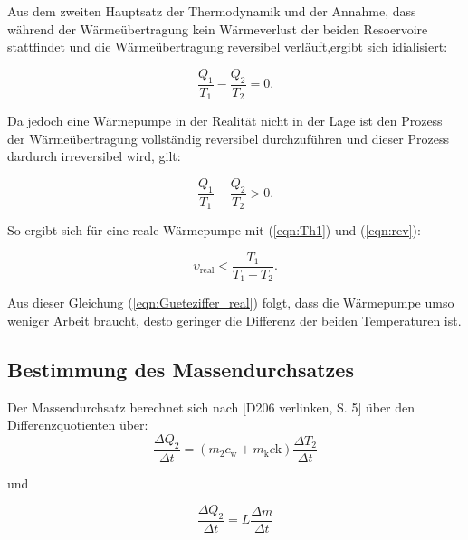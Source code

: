         Aus dem zweiten Hauptsatz der Thermodynamik und der Annahme, dass während der Wärmeübertragung kein Wärmeverlust der beiden Resoervoire stattfindet
         und die Wärmeübertragung reversibel verläuft,ergibt sich idialisiert:

        \begin{equation}
            \frac{Q_1}{T_1} - \frac{Q_2}{T_2} = 0.
            \label{eqn:irev}
        \end{equation}
        
        Da jedoch eine Wärmepumpe in der Realität nicht in der Lage ist den Prozess der Wärmeübertragung vollständig reversibel durchzuführen und dieser Prozess dardurch irreversibel wird, gilt:

        \begin{equation}
            \frac{Q_1}{T_1} - \frac{Q_2}{T_2} > 0.
            \label{eqn:rev}
        \end{equation}

        So ergibt sich für eine reale Wärmepumpe mit (\ref{eqn:Th1}) und (\ref{eqn:rev}):

        \begin{equation}
            \upsilon_\text{real} < \frac{T_1}{T_1 - T_2}.
            \label{eqn:Gueteziffer_real}
        \end{equation}

        Aus dieser Gleichung (\ref{eqn:Gueteziffer_real}) folgt, dass die Wärmepumpe umso weniger Arbeit braucht, desto geringer die Differenz der beiden Temperaturen ist.



        \subsection{Bestimmung des Massendurchsatzes}

        Der Massendurchsatz berechnet sich nach [D206 verlinken, S. 5] über den Differenzquotienten über:
        \begin{equation}
            \frac{\Delta Q_2}{\Delta t} = \left( m_2  c_\text{w} + m_\text{k} c\text{k}\right) \frac{\Delta T_2}{\Delta t}
            \label{eqn:mass1}
        \end{equation}

        und 

        \begin{equation}
            \frac{\Delta Q_2}{\Delta t} = L \frac{\Delta m}{\Delta t}
            \label{eqn:mass2}
        \end{equation}


